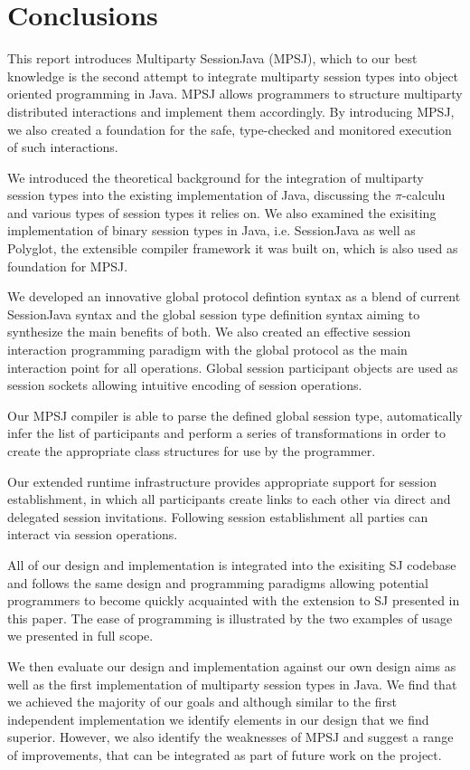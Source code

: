 \cleardoublepage
\chapter{Conclusions}
\label{ch:conclusions}



This report introduces Multiparty SessionJava (MPSJ), which to our best knowledge is the second attempt to integrate multiparty session types into object oriented programming in Java. MPSJ allows programmers to structure multiparty distributed interactions and implement them accordingly. By introducing MPSJ, we also created a foundation for the safe, type-checked and monitored execution of such interactions.

We introduced the theoretical background for the integration of multiparty session types into the existing implementation of Java, discussing the $\pi$-calculu and various types of session types it relies on. We also examined the exisiting implementation of binary session types in Java, i.e. SessionJava as well as Polyglot, the extensible compiler framework it was built on, which is also used as foundation for MPSJ.

We developed an innovative global protocol defintion syntax as a blend of current SessionJava syntax and the global session type definition syntax aiming to synthesize the main benefits of both. We also created an effective session interaction programming paradigm with the global protocol as the main interaction point for all operations. Global session participant objects are used as session sockets allowing intuitive encoding of session operations.

Our MPSJ compiler is able to parse the defined global session type, automatically infer the list of participants and perform a series of transformations in order to create the appropriate class structures for use by the programmer. 

Our extended runtime infrastructure provides appropriate support for session establishment, in which all participants create links to each other via direct and delegated session invitations. Following session establishment all parties can interact via session operations. 

All of our design and implementation is integrated into the exisiting SJ codebase and follows the same design and programming paradigms allowing potential programmers to become quickly acquainted with the extension to SJ presented in this paper. The ease of programming is illustrated by the two examples of usage we presented in full scope.

We then evaluate our design and implementation against our own design aims as well as the first implementation of multiparty session types in Java. We find that we achieved the majority of our goals and although similar to the first independent implementation we identify elements in our design that we find superior. However, we also identify the weaknesses of MPSJ and suggest a range of improvements, that can be integrated as part of future work on the project. 